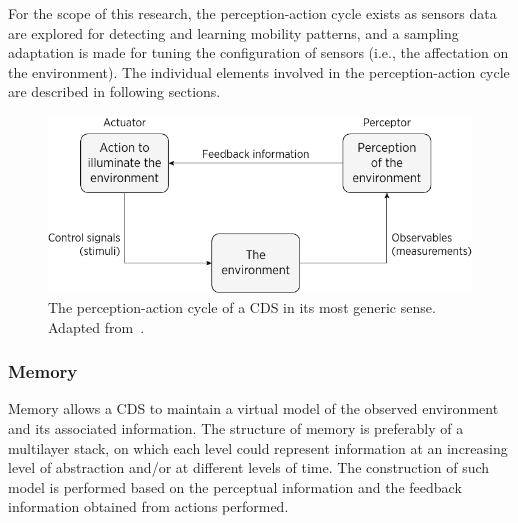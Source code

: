 \documentclass[ENG,PhD]{cinvestav}
\begin{document}
For the scope of this research, the perception-action cycle exists as sensors data are explored for detecting and learning mobility patterns, and a sampling adaptation is made for tuning the configuration of sensors (i.e., the affectation on the environment).
The individual elements involved in the perception-action cycle are described in following sections.

\begin{figure}
  \centering
  \includegraphics[scale=0.75]{vectors/cds-generic}
  \caption{The perception-action cycle of a CDS in its most generic sense. Adapted from~\cite{Haykin2012}.}
  \label{fig:cds-perception-action-cycle}
\end{figure}

\subsubsection*{Memory}
Memory allows a CDS to maintain a virtual model of the observed environment and its associated information.
The structure of memory is preferably of a multilayer stack, on which each level could represent information at an increasing level of abstraction and/or at different levels of time.
The construction of such model is performed based on the perceptual information and the feedback information obtained from actions performed.
\end{document}

